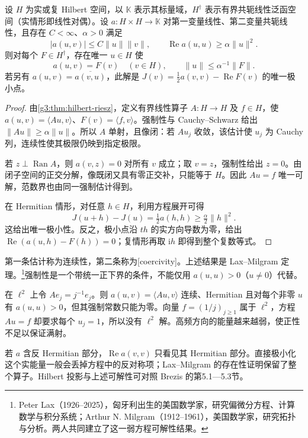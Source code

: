 \begin{theorem}\label{g3:thm:lax-milgram}
	设 \(H\) 为实或复 Hilbert 空间，以 \(\mathbb K\) 表示其标量域，\(H^\dagger\) 表示有界共轭线性泛函空间（实情形即线性对偶）。设 \(a:H\times H\to\mathbb K\) 对第一变量线性、第二变量共轭线性，且存在 \(C<\infty\)、\(\alpha>0\) 满足
	\[
		|a(u,v)|\le C\|u\|\|v\|,\qquad
		\operatorname{Re}a(u,u)\ge\alpha\|u\|^2.
	\]
	则对每个 \(F\in H^\dagger\)，存在唯一 \(u\in H\) 使
	\[
		a(u,v)=F(v)\quad(v\in H),\qquad
		\|u\|\le\alpha^{-1}\|F\|.
	\]
	若另有 \(a(u,v)=\overline{a(v,u)}\)，此解是
	\(J(v)=\tfrac12a(v,v)-\operatorname{Re}F(v)\) 的唯一极小点。
\end{theorem}
\begin{proof}
	由\cref{g3:thm:hilbert-riesz}，定义有界线性算子 \(A:H\to H\) 及 \(f\in H\)，使
	\(a(u,v)=\langle Au,v\rangle\)、\(F(v)=\langle f,v\rangle\)。强制性与 Cauchy--Schwarz 给出 \(\|Au\|\ge\alpha\|u\|\)。所以 \(A\) 单射，且像闭：若 \(Au_j\) 收敛，该估计使 \(u_j\) 为 Cauchy 列，连续性使其极限仍映到指定极限。

	若 \(z\perp\operatorname{Ran}A\)，则 \(a(v,z)=0\) 对所有 \(v\) 成立；取 \(v=z\)，强制性给出 \(z=0\)。由闭子空间的正交分解，像既闭又具有零正交补，只能等于 \(H\)。因此 \(Au=f\) 唯一可解，范数界也由同一强制估计得到。

	在 Hermitian 情形，对任意 \(h\in H\)，利用方程展开可得
	\[
		J(u+h)-J(u)=\tfrac12a(h,h)\ge\tfrac\alpha2\|h\|^2.
	\]
	这给出唯一极小性。反之，极小点沿 \(th\) 的实方向导数为零，给出 \(\operatorname{Re}(a(u,h)-F(h))=0\)；复情形再取 \(\mathrm ih\) 即得到整个复数等式。
\end{proof}

第一条估计称为连续性，第二条称为[coercivity]。上述结果是 Lax--Milgram 定理。\footnote{Peter Lax（1926--2025），匈牙利出生的美国数学家，研究偏微分方程、计算数学与积分系统；Arthur N. Milgram（1912--1961），美国数学家，研究拓扑与分析。两人共同建立了这一弱方程可解性结果。}强制性是一个带统一正下界的条件，不能仅用 \(a(u,u)>0\)（\(u\ne0\)）代替。

\begin{example}\label{g3:exm:positive-not-coercive}
	在 \(\ell^2\) 上令 \(Ae_j=j^{-1}e_j\)。则 \(a(u,v)=\langle Au,v\rangle\) 连续、Hermitian 且对每个非零 \(u\) 有 \(a(u,u)>0\)，但其强制常数只能为零。向量 \(f=(1/j)_{j\ge1}\) 属于 \(\ell^2\)，方程 \(Au=f\) 却要求每个 \(u_j=1\)，所以没有 \(\ell^2\) 解。高频方向的能量越来越弱，使正性不足以保证满射。
\end{example}

若 \(a\) 含反 Hermitian 部分，\(\operatorname{Re}a(v,v)\) 只看见其 Hermitian 部分。直接极小化这个实能量一般会丢掉方程中的反对称项；Lax--Milgram 的存在性证明保留了整个算子。Hilbert 投影与上述可解性可对照 Brezis 的第5.1—5.3节。\cite[定理5.2、5.5，推论5.8]{Brezis2011}

